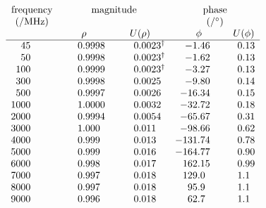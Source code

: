 \documentclass[11pt,a4paper]{LMIReport}
\begin{document}
\begin{center} 
\begin{singlespace}
 	\small	%
 
  	\setlength{\extrarowheight}{3pt}
  
	\[
  		\begin{array}{SSSSS}
    		\multicolumn{1}{c}{ \text{frequency} } & 
    		\multicolumn{2}{c}{ \text{magnitude} } &
    		\multicolumn{2}{c}{ \text{phase} } 
    		\\
    		\multicolumn{1}{c}{ (/\si{\mega\hertz}) } &  
    		\multicolumn{2}{c}{  } &
    		\multicolumn{2}{c}{ (/\si{\degree}) } 
    		\\
     		& {\rho} & {U(\rho)} & {\phi} & {U(\phi)} 
     		\\ \hline %

		45 &   0.9998 &   0.0023$^\dagger$ &    -1.46 &     0.13     \\
		50 &   0.9998 &   0.0023$^\dagger$ &    -1.62 &     0.13     \\
		100 &   0.9999 &   0.0023$^\dagger$ &    -3.27 &     0.13    \\
		300 &   0.9998 &   0.0025 &    -9.80 &     0.14    \\
		500 &   0.9997 &   0.0026 &   -16.34 &     0.15    \\
		1000 &   1.0000 &   0.0032 &   -32.72 &     0.18   \\
		2000 &   0.9994 &   0.0054 &   -65.67 &     0.31  \\
		3000 &    1.000 &    0.011 &   -98.66 &     0.62   \\
		4000 &    0.999 &    0.013 &  -131.74 &     0.78   \\
		5000 &    0.999 &    0.016 &  -164.77 &     0.90   \\
		6000 &    0.998 &    0.017 &  +162.15 &     0.99   \\
		7000 &    0.997 &    0.018 &   +129.0 &      1.1   \\
		8000 &    0.997 &    0.018 &    +95.9 &      1.1   \\
		9000 &    0.996 &    0.018 &    +62.7 &      1.1  \\
		
		\end{array}
	\]
	
\end{singlespace}
\end{center}
\end{document}
